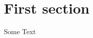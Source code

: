 \documentclass[12pt, a4paper]{article}
\begin{document}
\section{First section}
Some Text
\end{document}
